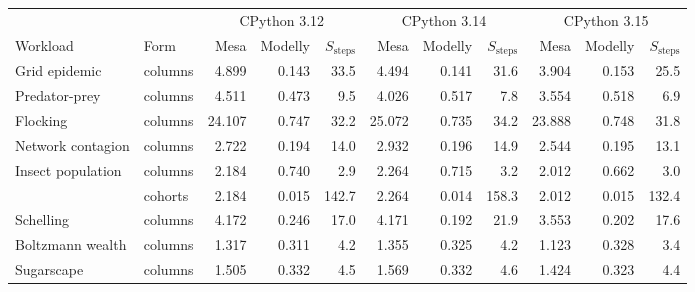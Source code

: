 \begin{tabular}{llrrrrrrrrr}
\toprule
 & & \multicolumn{3}{c}{CPython 3.12} & \multicolumn{3}{c}{CPython 3.14} & \multicolumn{3}{c}{CPython 3.15} \\
\cmidrule(lr){3-5} \cmidrule(lr){6-8} \cmidrule(lr){9-11}
Workload & Form & Mesa & Modelly & $S_{\mathrm{steps}}$ & Mesa & Modelly & $S_{\mathrm{steps}}$ & Mesa & Modelly & $S_{\mathrm{steps}}$ \\
\midrule
Grid epidemic & columns & 4.899 & 0.143 & 33.5 & 4.494 & 0.141 & 31.6 & 3.904 & 0.153 & 25.5 \\
Predator-prey & columns & 4.511 & 0.473 & 9.5 & 4.026 & 0.517 & 7.8 & 3.554 & 0.518 & 6.9 \\
Flocking & columns & 24.107 & 0.747 & 32.2 & 25.072 & 0.735 & 34.2 & 23.888 & 0.748 & 31.8 \\
Network contagion & columns & 2.722 & 0.194 & 14.0 & 2.932 & 0.196 & 14.9 & 2.544 & 0.195 & 13.1 \\
Insect population & columns & 2.184 & 0.740 & 2.9 & 2.264 & 0.715 & 3.2 & 2.012 & 0.662 & 3.0 \\
 & cohorts & 2.184 & 0.015 & 142.7 & 2.264 & 0.014 & 158.3 & 2.012 & 0.015 & 132.4 \\
Schelling & columns & 4.172 & 0.246 & 17.0 & 4.171 & 0.192 & 21.9 & 3.553 & 0.202 & 17.6 \\
Boltzmann wealth & columns & 1.317 & 0.311 & 4.2 & 1.355 & 0.325 & 4.2 & 1.123 & 0.328 & 3.4 \\
Sugarscape & columns & 1.505 & 0.332 & 4.5 & 1.569 & 0.332 & 4.6 & 1.424 & 0.323 & 4.4 \\
\bottomrule
\end{tabular}
